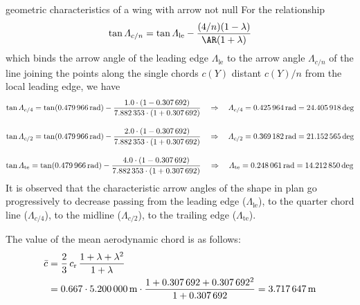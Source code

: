 \documentclass[[12pt,twoside]{book}
\begin{document}
\begin{myExampleX}{geometric characteristics of a wing with arrow not null}{}
For the relationship
\[
\tan\Lambda_{c/n} = \tan\Lambda_\mathrm{le}-\dfrac{(4/n)(1-\lambda)}{\AR(1+\lambda)}
\]
which binds the arrow angle of the leading edge $\Lambda_\mathrm{le}$  to the arrow angle
$\Lambda_{c/n}$ of the line joining the points along the single chords $c(Y)$ distant $c(Y)/n$ 
from the local leading edge, we have
\[
\tan
\Lambda_{c/4}
   = \tan (\SI[round-precision=3]{\myLambdaLERad}{\radian})
      - \dfrac{
         \num[round-precision=2]{1.0}
         \cdot (1-\SI[round-precision=2]{\myTaperRatioWing}{})
      }{
         \num[round-precision=2]{\myAspectRatioWing}
         \cdot (1+\SI[round-precision=2]{\myTaperRatioWing}{})} 
   \quad
   \Rightarrow
   \quad
   \Lambda_{c/4}
      =\SI[round-precision=3]{\myLambdaCQuarterRad}{\radian} 
      =\SI[round-precision=1]{\myLambdaCQuarterDeg}{\deg}
\]

\[
\tan
\Lambda_{c/2}
   = \tan (\SI[round-precision=3]{\myLambdaLERad}{\radian})
      - \dfrac{
         \num[round-precision=2]{2.0}
         \cdot (1-\SI[round-precision=2]{\myTaperRatioWing}{})
      }{
         \num[round-precision=2]{\myAspectRatioWing}
         \cdot (1+\SI[round-precision=2]{\myTaperRatioWing}{})} 
   \quad
   \Rightarrow
   \quad
   \Lambda_{c/2}
      =\SI[round-precision=3]{\myLambdaCHalfRad}{\radian} 
      =\SI[round-precision=1]{\myLambdaCHalfDeg}{\deg} 
\]

\[
\tan
\Lambda_\mathrm{te}
   = \tan (\SI[round-precision=3]{\myLambdaLERad}{\radian})
      - \dfrac{
         \num[round-precision=2]{4.0}
         \cdot (1-\SI[round-precision=2]{\myTaperRatioWing}{})
      }{
         \num[round-precision=2]{\myAspectRatioWing}
         \cdot (1+\SI[round-precision=2]{\myTaperRatioWing}{})} 
   \quad
   \Rightarrow
   \quad
   \Lambda_\mathrm{te}
      =\SI[round-precision=3]{\myLambdaTERad}{\radian}
      =\SI[round-precision=1]{\myLambdaTEDeg}{\deg} 
\]
It is observed that the characteristic arrow angles of the shape in plan go progressively
to decrease passing from the leading edge ($\Lambda_\mathrm{le}$), 
to the quarter chord line ($\Lambda_{c/4}$),
to the midline ($\Lambda_{c/2}$),
to the trailing edge ($\Lambda_\mathrm{te}$).

The value of the mean aerodynamic chord is as follows:
\[
\begin{split}
\bar{c} & {}= \frac{2}{3} \, c_\mathrm{r} \, \frac{1+\lambda + \lambda^2}{1+\lambda} \\
  & {}=
    \num{0.667} \cdot \SI[round-precision=2]{\myChordRootWingMT}{\metre}
      \cdot 
        \frac{
          1 + \SI[round-precision=2]{\myTaperRatioWing}{} + \SI[round-precision=2]{\myTaperRatioWing}{}^2
        }{
          1 + \SI[round-precision=2]{\myTaperRatioWing}{}
        }
    = \SI[round-precision=2]{\myMACWingMT}{\metre} 
\end{split}
\]


\end{myExampleX}
\end{document}
